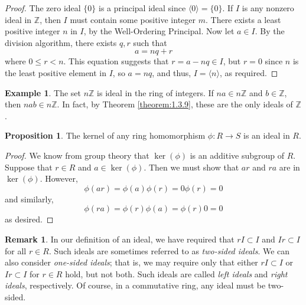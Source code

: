 \documentclass[11pt]{book}
\theoremstyle{definition}\newtheorem{definition}[subsection]{Definition}
\theoremstyle{definition}\newtheorem{example}[subsection]{Example}
\theoremstyle{definition}\newtheorem{notation}[subsection]{Notation}
\theoremstyle{definition}\newtheorem{remark}[subsection]{Remark}
\theoremstyle{theorem}\newtheorem{theorem}[subsection]{Theorem}
\theoremstyle{theorem}\newtheorem{lemma}[subsection]{Lemma}
\theoremstyle{theorem}\newtheorem{proposition}[subsection]{Proposition}
\theoremstyle{theorem}\newtheorem{corollary}[subsection]{Corollary}
\newcommand{\Z}{\mathbb{Z}}
\begin{document}
\begin{proof}
    The zero ideal $\{0\}$ is a principal ideal since $\langle{0}\rangle = \{0\}$. If $I$ is any nonzero ideal in $\Z$, then $I$ must contain some positive integer $m$. There exists a least positive integer $n$ in $I$, by the Well-Ordering Principal. Now let $a \in I$. By the division algorithm, there exists $q, r$ such that
    \begin{equation*}
        a = nq + r
    \end{equation*}
    where $0 \leq r < n$. This equation suggests that $r = a - nq \in I$, but $r = 0$ since $n$ is the least positive element in $I$, so $a = nq$, and thus, $I = \langle{n}\rangle$, as required.
\end{proof}

\begin{example}\label{example:1.3.10}
    The set $n\Z$ is ideal in the ring of integers. If $na \in n\Z$ and $b \in \Z$, then $nab \in n\Z$. In fact, by Theorem \ref{theorem:1.3.9}, these are the only ideals of $\Z$.
\end{example}

\begin{proposition}\label{proposition:1.3.11}
    The kernel of any ring homomorphism $\phi : R \to S$ is an ideal in $R$.
\end{proposition}

\begin{proof}
    We know from group theory that $\ker(\phi)$ is an additive subgroup of $R$. Suppose that $r \in R$ and $a \in \ker(\phi)$. Then we must show that $ar$ and $ra$ are in $\ker(\phi)$. However,
    \begin{equation*}
        \phi(ar) = \phi(a)\phi(r) = 0\phi(r) = 0
    \end{equation*}
    and similarly,
    \begin{equation*}
        \phi(ra) = \phi(r)\phi(a) = \phi(r)0 = 0
    \end{equation*}
    as desired.
\end{proof}

\begin{remark}\label{remark:1.3.12}
    In our definition of an ideal, we have required that $rI \subset I$ and $Ir \subset I$ for all $r \in R$. Such ideals are sometimes referred to as \emph{two-sided ideals}. We can also consider \emph{one-sided ideals}; that is, we may require only that either $rI \subset I$ or $Ir \subset I$ for $r \in R$ hold, but not both. Such ideals are called \emph{left ideals} and \emph{right ideals}, respectively. Of course, in a commutative ring, any ideal must be two-sided.
\end{remark}
\end{document}
